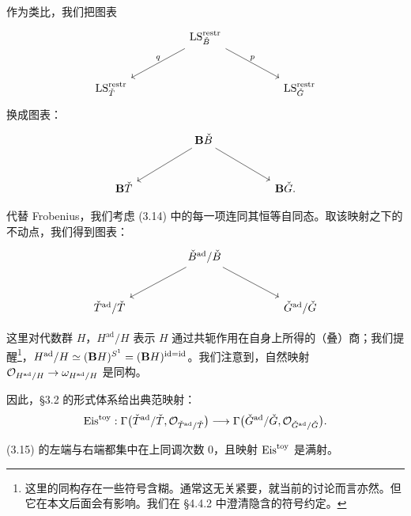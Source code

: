 作为类比，我们把图表
\[
\begin{tikzcd}[column sep=huge, row sep=large]
  & \LS^{\restr}_{\bB} \arrow[dl, "q"{above}] \arrow[dr, "p"{above}] & \\
  \LS^{\restr}_{\bT} & & \LS^{\restr}_{\bG}
\end{tikzcd}
\]
换成图表：
\begin{equation}
\begin{tikzcd}[column sep=huge, row sep=large]
  & \mathbf{B}\check B \arrow[dl] \arrow[dr] & \\
  \mathbf{B}\check T & & \mathbf{B}\check G.
\end{tikzcd}
\end{equation}

代替 Frobenius，我们考虑 (3.14) 中的每一项连同其恒等自同态。取该映射之下的不动点，我们得到图表：
\[
\begin{tikzcd}[column sep=huge, row sep=large]
  & \check B^{\mathrm{ad}}/\check B \arrow[dl] \arrow[dr] & \\
  \check T^{\mathrm{ad}}/\check T & & \check G^{\mathrm{ad}}/\check G
\end{tikzcd}
\]

这里对代数群 $H$，$H^{\mathrm{ad}}/H$ 表示 $H$ 通过共轭作用在自身上所得的（叠）商；我们提醒\footnote{这里的同构存在一些符号含糊。通常这无关紧要，就当前的讨论而言亦然。但它在本文后面会有影响。我们在 §4.4.2 中澄清隐含的符号约定。}，$H^{\mathrm{ad}}/H\simeq(\mathbf{B}H)^{S^1}=(\mathbf{B}H)^{\operatorname{id}=\operatorname{id}}$。我们注意到，自然映射 $\mathcal{O}_{H^{\mathrm{ad}}/H}\to\omega_{H^{\mathrm{ad}}/H}$ 是同构。

因此，§3.2 的形式体系给出典范映射：
\begin{equation}
  \mathrm{Eis}^{\mathrm{toy}} : \Gamma\bigl(\check T^{\mathrm{ad}}/\check T,\mathcal{O}_{\check T^{\mathrm{ad}}/\check T}\bigr)
  \longrightarrow
  \Gamma\bigl(\check G^{\mathrm{ad}}/\check G,\mathcal{O}_{\check G^{\mathrm{ad}}/\check G}\bigr).
\end{equation}

\begin{lem}
(3.15) 的左端与右端都集中在上同调次数 $0$，且映射 $\mathrm{Eis}^{\mathrm{toy}}$ 是满射。
\end{lem}

